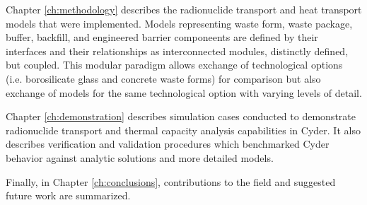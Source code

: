 
Chapter \ref{ch:methodology} describes the radionuclide transport and heat transport 
models that were implemented. Models representing waste form, waste package, 
buffer, backfill, and engineered barrier componeents are defined by their 
interfaces and their relationships as interconnected modules, distinctly 
defined, but coupled. This modular paradigm allows exchange  of technological 
options (i.e. borosilicate glass and concrete waste forms) for comparison but 
also exchange of models for the same technological option with varying levels 
of detail.  


Chapter \ref{ch:demonstration} describes simulation cases conducted to 
demonstrate radionuclide transport and thermal capacity analysis capabilities in Cyder. It 
also describes verification and validation procedures which benchmarked Cyder 
behavior against analytic solutions and more detailed models.


Finally, in Chapter \ref{ch:conclusions}, contributions to the field and 
suggested future work are summarized. 




% 

